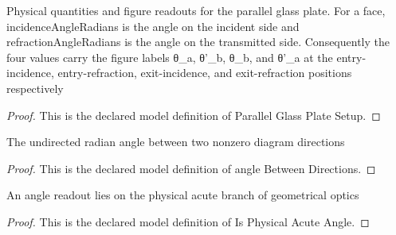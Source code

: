 \begin{definition}
  \label{def:physics:phyx-mini-0102:phyxminiproblems-problemphyxmini0102-parallelglassplatesetup}
  Physical quantities and figure readouts for the parallel glass plate. For a face, incidenceAngleRadians is the angle on the incident side and refractionAngleRadians is the angle on the transmitted side. Consequently the four values carry the figure labels θ\_a, θ'\_b, θ\_b, and θ'\_a at the entry-incidence, entry-refraction, exit-incidence, and exit-refraction positions respectively
\end{definition}
\begin{proof}
  This is the declared model definition of Parallel Glass Plate Setup.
\end{proof}
\begin{definition}
  \label{def:physics:phyx-mini-0102:phyxminiproblems-problemphyxmini0102-anglebetweendirections}
  The undirected radian angle between two nonzero diagram directions
\end{definition}
\begin{proof}
  This is the declared model definition of angle Between Directions.
\end{proof}
\begin{definition}
  \label{def:physics:phyx-mini-0102:phyxminiproblems-problemphyxmini0102-isphysicalacuteangle}
  An angle readout lies on the physical acute branch of geometrical optics
\end{definition}
\begin{proof}
  This is the declared model definition of Is Physical Acute Angle.
\end{proof}
